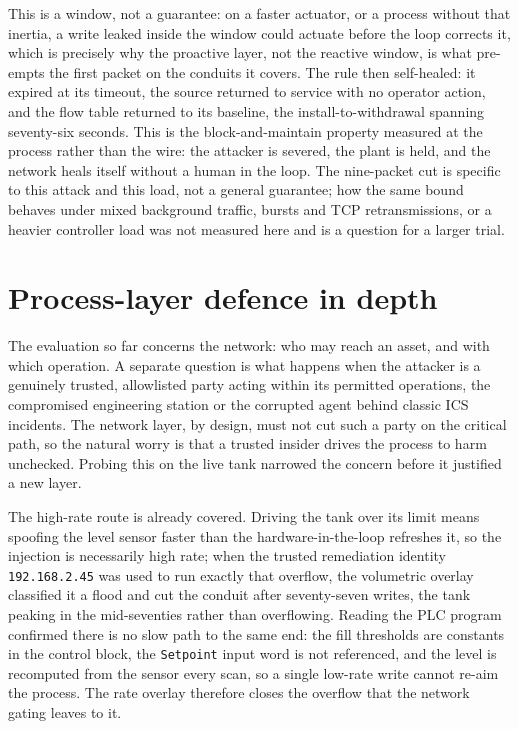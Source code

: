 This is a window, not a guarantee: on a faster actuator, or a process without that inertia, a write leaked inside the window could actuate before the loop corrects it, which is precisely why the proactive layer, not the reactive window, is what pre-empts the first packet on the conduits it covers. The rule then self-healed: it expired at its timeout, the source returned to service with no operator action, and the flow table returned to its baseline, the install-to-withdrawal spanning seventy-six seconds. This is the block-and-maintain property measured at the process rather than the wire: the attacker is severed, the plant is held, and the network heals itself without a human in the loop. The nine-packet cut is specific to this attack and this load, not a general guarantee; how the same bound behaves under mixed background traffic, bursts and TCP retransmissions, or a heavier controller load was not measured here and is a question for a larger trial.

\section{Process-layer defence in depth}
\label{sec:evalguardian}

The evaluation so far concerns the network: who may reach an asset, and with which operation. A separate question is what happens when the attacker is a genuinely trusted, allowlisted party acting within its permitted operations, the compromised engineering station or the corrupted agent behind classic ICS incidents. The network layer, by design, must not cut such a party on the critical path, so the natural worry is that a trusted insider drives the process to harm unchecked. Probing this on the live tank narrowed the concern before it justified a new layer.

The high-rate route is already covered. Driving the tank over its limit means spoofing the level sensor faster than the hardware-in-the-loop refreshes it, so the injection is necessarily high rate; when the trusted remediation identity \texttt{192.168.2.45} was used to run exactly that overflow, the volumetric overlay classified it a flood and cut the conduit after seventy-seven writes, the tank peaking in the mid-seventies rather than overflowing. Reading the PLC program confirmed there is no slow path to the same end: the fill thresholds are constants in the control block, the \texttt{Setpoint} input word is not referenced, and the level is recomputed from the sensor every scan, so a single low-rate write cannot re-aim the process. The rate overlay therefore closes the overflow that the network gating leaves to it.


